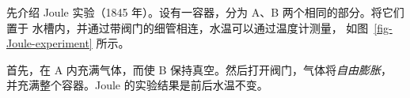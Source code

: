 %     
%     
%     
%     
%     
%     
%     
%     
%     

先介绍 Joule 实验（1845 年）。设有一容器，分为 A、B 两个相同的部分。将它们置于
水槽内，并通过带阀门的细管相连，水温可以通过温度计测量，
如图~\ref{fig-Joule-experiment} 所示。

首先，在 A 内充满气体，而使 B 保持真空。然后打开阀门，气体将\emph{自由膨胀}，
并充满整个容器。Joule 的实验结果是前后水温不变。

